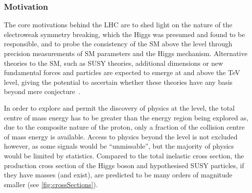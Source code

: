 \subsubsection{Motivation}
The core motivations behind the LHC are to shed light on the nature of the electroweak symmetry breaking, which the Higgs was presumed and found to be responsible, and to probe the consistency of the SM above the \TeV level through precision measurements of SM parameters and the Higgs mechanism.
Alternative theories to the SM, such as SUSY theories, additional dimensions or new fundamental forces and particles are expected to emerge at and above the TeV level, giving the potential to ascertain whether these theories have any basis beyond mere conjecture~\cite{Bayatian:2006zz}.

In order to explore and permit the discovery of physics at the \TeV level, the total centre of mass energy has to be greater than the energy region being explored as, due to the composite nature of the proton, only a fraction of the collision centre of mass energy is available.
Access to physics beyond the \TeV level is not excluded	however, as some signals would be ``unmissable'', but the majority of physics would be limited by statistics.
Compared to the total inelastic cross section, the production cross section of the Higgs boson and hypothesised SUSY particles, if they have \TeV masses (and exist), are predicted to be many orders of magnitude smaller (see \ref{fig:crossSections}).

